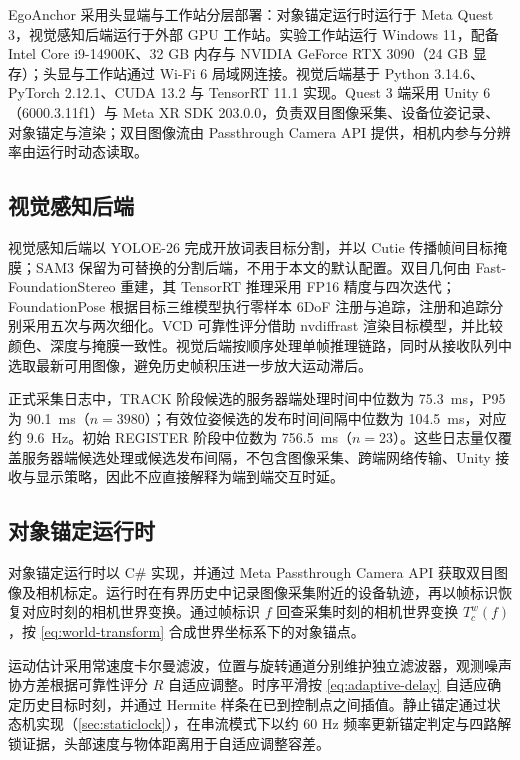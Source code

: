 \documentclass[9pt,twocolumn,letterpaper]{extarticle}
\begin{document}
EgoAnchor 采用头显端与工作站分层部署：对象锚定运行时运行于 Meta Quest 3，视觉感知后端运行于外部 GPU 工作站。实验工作站运行 Windows 11，配备 Intel Core i9-14900K、32 GB 内存与 NVIDIA GeForce RTX 3090（24 GB 显存）；头显与工作站通过 Wi-Fi 6 局域网连接。视觉后端基于 Python 3.14.6、PyTorch 2.12.1、CUDA 13.2 与 TensorRT 11.1 实现。Quest 3 端采用 Unity 6（6000.3.11f1）与 Meta XR SDK 203.0.0，负责双目图像采集、设备位姿记录、对象锚定与渲染；双目图像流由 Passthrough Camera API 提供，相机内参与分辨率由运行时动态读取。

\subsection{视觉感知后端}


视觉感知后端以 YOLOE-26 完成开放词表目标分割，并以 Cutie 传播帧间目标掩膜；SAM3 保留为可替换的分割后端，不用于本文的默认配置。双目几何由 Fast-FoundationStereo 重建，其 TensorRT 推理采用 FP16 精度与四次迭代；FoundationPose 根据目标三维模型执行零样本 6DoF 注册与追踪，注册和追踪分别采用五次与两次细化。VCD 可靠性评分借助 nvdiffrast 渲染目标模型，并比较颜色、深度与掩膜一致性。视觉后端按顺序处理单帧推理链路，同时从接收队列中选取最新可用图像，避免历史帧积压进一步放大运动滞后。

正式采集日志中，TRACK 阶段候选的服务器端处理时间中位数为 75.3~ms，P95 为 90.1~ms（$n=3980$）；有效位姿候选的发布时间间隔中位数为 104.5~ms，对应约 9.6~Hz。初始 REGISTER 阶段中位数为 756.5~ms（$n=23$）。这些日志量仅覆盖服务器端候选处理或候选发布间隔，不包含图像采集、跨端网络传输、Unity 接收与显示策略，因此不应直接解释为端到端交互时延。

\subsection{对象锚定运行时}


对象锚定运行时以 C\# 实现，并通过 Meta Passthrough Camera API 获取双目图像及相机标定。运行时在有界历史中记录图像采集附近的设备轨迹，再以帧标识恢复对应时刻的相机世界变换。通过帧标识 $f$ 回查采集时刻的相机世界变换 $T_c^w (f)$，按 \ref{eq:world-transform} 合成世界坐标系下的对象锚点。

运动估计采用常速度卡尔曼滤波，位置与旋转通道分别维护独立滤波器，观测噪声协方差根据可靠性评分 $R$ 自适应调整。时序平滑按 \ref{eq:adaptive-delay} 自适应确定历史目标时刻，并通过 Hermite 样条在已到控制点之间插值。静止锚定通过状态机实现（\ref{sec:staticlock}），在串流模式下以约 60 Hz 频率更新锚定判定与四路解锁证据，头部速度与物体距离用于自适应调整容差。
\end{document}
